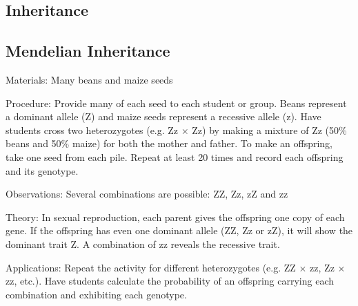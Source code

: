 \begin{multicols}{2}
\columnbreak


\section*{Inheritance} 


\subsection{Mendelian Inheritance} %


\begin{description*}
\item[Materials:]{Many beans and maize seeds}
\item[Procedure:]{Provide many of each seed to each student or group. Beans represent a dominant allele (Z) and maize seeds represent a recessive allele (z). Have students cross two heterozygotes (e.g. Zz $\times$ Zz) by making a mixture of Zz (50\% beans and 50\% maize) for both the mother and father. To make an offspring, take one seed from each pile. Repeat at least 20 times and record each offspring and its genotype.}
\item[Observations:]{Several combinations are possible: ZZ, Zz, zZ and zz}
\item[Theory:]{In sexual reproduction, each parent gives the offspring one copy of each gene. If the offspring has even one dominant allele (ZZ, Zz or zZ), it will show the dominant trait Z. A combination of zz reveals the recessive trait.}
\item[Applications:]{Repeat the activity for different heterozygotes (e.g. ZZ $\times$ zz, Zz $\times$ zz, etc.). Have students calculate the probability of an offspring carrying each combination and exhibiting each genotype.}
\end{description*}



\end{multicols}
